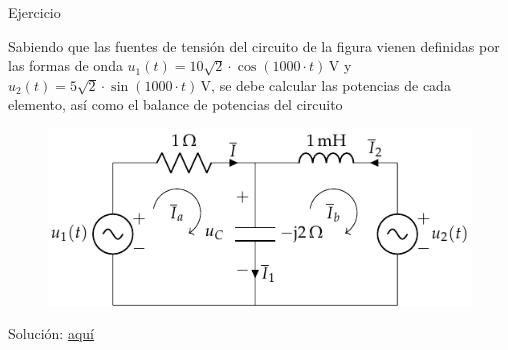 \documentclass[aspectratio=169, usenames,svgnames,dvipsnames]{beamer}
\begin{document}

%    
%        


\begin{frame}{Ejercicio}

    \vspace{5mm}
    Sabiendo que las fuentes de tensión del circuito de la figura vienen definidas por las formas de onda $u_1(t)=10\sqrt{2}\cdot \cos(1000\cdot t) \,\si{\volt}$ y $u_2(t)=5\sqrt{2}\cdot \sin(1000\cdot t) \,\si{\volt}$, se debe calcular las potencias de cada elemento, así como el balance de potencias del circuito 
		\begin{figure}[H]
			\centering
			\includegraphics[width=0.6\linewidth]{../figs/ej7_BT2.pdf}
		\end{figure}

  \alert{Solución}: \href{https://raw.githubusercontent.com/ETSIDI-IE/tc/master/docs/ejercicios_clase/TC1_02_Ejemplo_2_9_libro_LBB.pdf}{aquí}
\end{frame}
\end{document}

